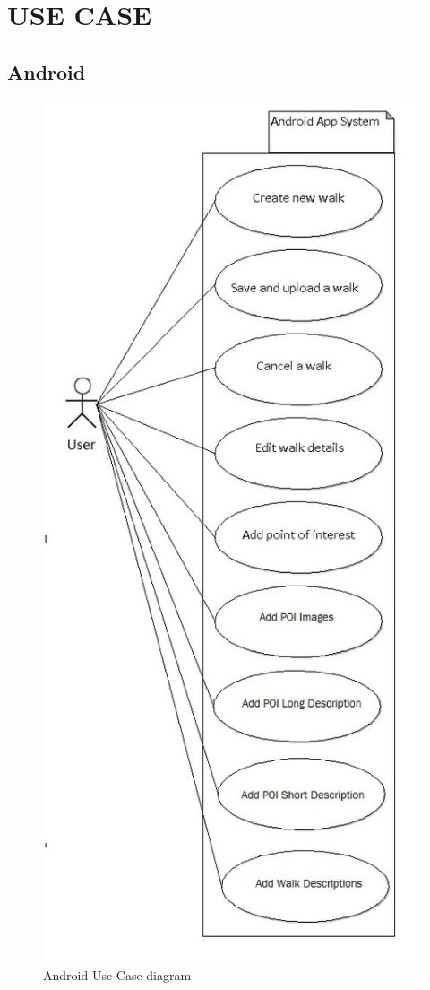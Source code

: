 \documentclass[12pt]{article}
\begin{document}
\section{USE CASE}
\subsection{Android}
\begin{figure}[htp]
\centering
\includegraphics[scale=0.50]{Project_Plan/docs/Android_use_case_final.jpg}
\caption{Android Use-Case diagram}
\label{Android Use-Case Diagram}
\end{figure}
\end{document}
